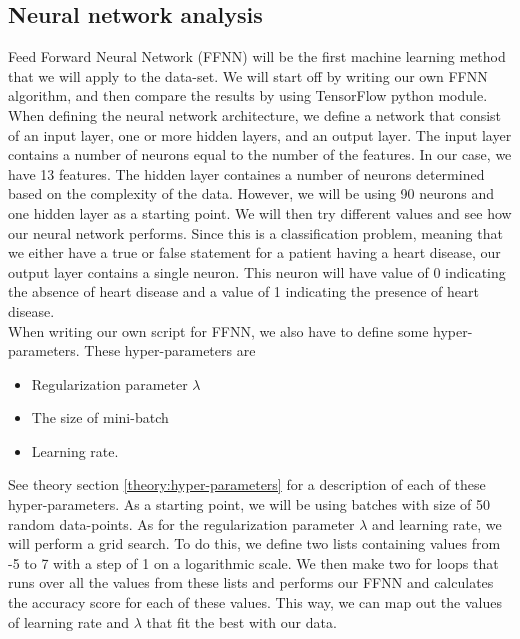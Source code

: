 \documentclass[reprint,english,notitlepage]{revtex4-1}  %
\begin{document}
\subsection{Neural network analysis}
Feed Forward Neural Network (FFNN) will be the first machine learning method that we will apply to the data-set. We will start off by writing our own FFNN algorithm, and then compare the results by using TensorFlow python module.
\vspace{3mm}
\\
When defining the neural network architecture, we define a network that consist of an input layer, one or more hidden layers, and an output layer. The input layer contains a number of neurons equal to the number of the features. In our case, we have 13 features. The hidden layer containes a number of neurons determined based on the complexity of the data. However, we will be using 90 neurons and one hidden layer as a starting point. We will then try different values and see how our neural network performs. Since this is a classification problem, meaning that we either have a true or false statement for a patient having a heart disease, our output layer contains a single neuron. This neuron will have value of 0 indicating the absence of heart disease and a value of 1 indicating the presence of heart disease.
\vspace{3mm}
\\
When writing our own script for FFNN, we also have to  define some hyper-parameters. These hyper-parameters are
\begin{itemize}
    \item Regularization parameter $\lambda$
    \item The size of mini-batch
    \item Learning rate.
\end{itemize}
See theory section \ref{theory:hyper-parameters} for a description of each of these hyper-parameters. As a starting point, we will be using batches with size of 50 random data-points. As for the regularization parameter $\lambda$ and learning rate, we will perform a grid search. 
To do this, we define two lists containing values from -5 to 7 with a step of 1 on a logarithmic scale. We then make two for loops that runs over all the values from these lists and performs our FFNN and calculates the accuracy score for each of these values. This way, we can map out the values of learning rate and $\lambda$ that fit the best with our data.
\vspace{3mm}
\\
\end{document}
